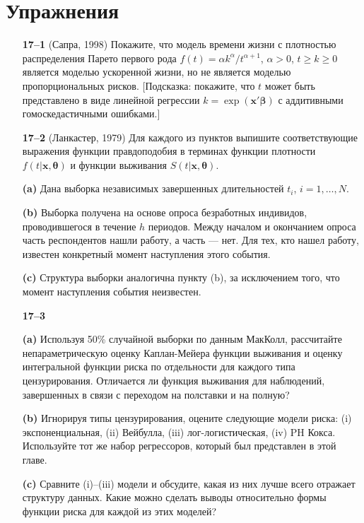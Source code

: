\section{Упражнения}\label{sec:17.ex}
\begin{itemize}

    \item[\textbf{17--1}]
(Сапра, 1998) Покажите, что модель времени жизни с плотностью распределения Парето первого рода $f(t) = \alpha k^\alpha /t^{\alpha + 1}$, $\alpha > 0$, $t \ge k \ge 0$ является моделью ускоренной жизни, но не является моделью пропорциональных рисков. [Подсказка: покажите, что $t$ может быть представлено в виде линейной регрессии $k = \exp(\mathbf{x}'\bm{\beta})$ с аддитивными гомоскедастичными ошибками.]

    \item[\textbf{17--2}] (Ланкастер, 1979) Для каждого из пунктов выпишите соответствующие выражения функции правдоподобия в терминах функции плотности $f(t|\mathbf{x},\bm{\theta})$ и функции выживания $S(t|\mathbf{x},\bm{\theta})$.
        \item[\textbf{(a)}] Дана выборка независимых завершенных длительностей $t_i$, $i = 1,  \ldots , N$.
        \item[\textbf{(b)}] Выборка получена на основе опроса безработных индивидов, проводившегося в течение $h$ периодов. Между началом и окончанием опроса часть респондентов нашли работу, а часть --- нет. Для тех, кто нашел работу, известен конкретный момент наступления этого события.
        \item[\textbf{(c)}] Структура выборки аналогична пункту (b), за исключением того, что момент наступления события неизвестен.

    \item[\textbf{17--3}]
        \item[\textbf{(a)}] Используя 50\% случайной выборки по данным МакКолл, рассчитайте непараметрическую оценку Каплан-Мейера функции выживания и оценку интегральной функции риска по отдельности для каждого типа цензурирования. Отличается ли функция выживания для наблюдений, завершенных в связи с переходом на полставки и на полную?
        \item[\textbf{(b)}] Игнорируя типы цензурирования, оцените следующие модели риска: (i) экспоненциальная, (ii) Вейбулла, (iii) лог-логистическая, (iv) PH Кокса. Используйте тот же набор регрессоров, который был представлен в этой главе.
        \item[\textbf{(c)}] Сравните (i)--(iii) модели и обсудите, какая из них лучше всего отражает структуру данных. Какие можно сделать выводы относительно формы функции риска для каждой из этих моделей?
\end{itemize}

